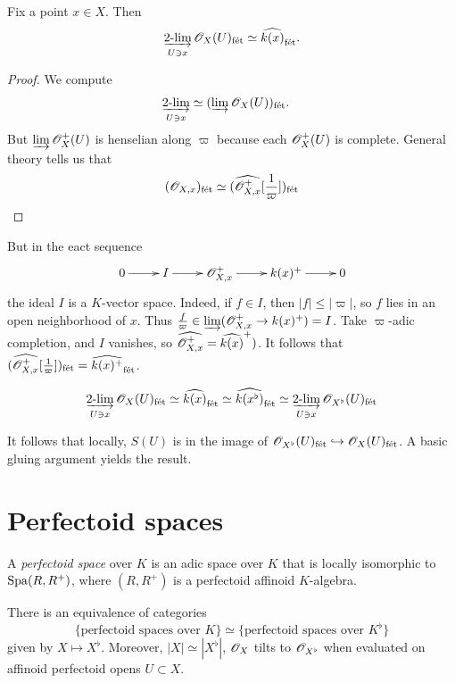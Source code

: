 \documentclass{article}
\begin{document}
\begin{lemma}
Fix a point $x\in X$. Then 
\[
  \twolim_{U\ni x} \sO_X(U)_\fet \simeq \widehat{k(x)}_\fet .
\]
\end{lemma}
\begin{proof}
We compute 
\begin{align*}
  \twolim_{U\ni x} &\simeq (\varinjlim \sO_X(U))_\fet .
\end{align*}
But $\varinjlim \mathscr{O}_X^+(U)$ is henselian along $\varpi$ because each 
$\mathscr{O}_X^+(U)$ is complete. General theory tells us that 
\[
  (\mathscr{O}_{X,x})_{\textnormal{f\'et}} \simeq (\widehat{\mathscr{O}_{X,x}^+}[\frac 1 \varpi])_{\textnormal{f\'et}}
\]
\end{proof}
But in the eact sequence 
\[\xymatrix{
  0 \ar[r] 
    & I \ar[r] 
    & \sO_{X,x}^+ \ar[r] 
    & k(x)^+ \ar[r] 
    & 0 
}\]
the ideal $I$ is a $K$-vector space. Indeed, if $f\in I$, then $|f|\leqslant |\varpi|$, 
so $f$ lies in an open neighborhood of $x$. Thus 
$\frac f \varpi \in \varinjlim(\mathscr{O}_{X,x}^+ \to k(x)^+) = I$. Take $\varpi$-adic 
completion, and $I$ vanishes, so $\widehat{\mathscr{O}_{X,x}^+} = \widehat{k(x)}^+)$. It 
follows that $(\widehat{\mathscr{O}_{X,x}^+}[\frac 1 \varpi])_{\textnormal{f\'et}} = \widehat{k(x)^+}_{\textnormal{f\'et}}$. 

\begin{corollary}
\[
  \twolim_{U\ni x} \sO_X(U)_\fet \simeq \widehat{k(x)}_\fet \simeq \widehat{k(x^\flat)}_\fet \simeq \twolim_{U\ni x} \sO_{X^\flat}(U)_\fet 
\]
\end{corollary}

It follows that locally, $S(U)$ is in the image of $\mathscr{O}_{X^\flat}(U)_{\textnormal{f\'et}}\hookrightarrow \mathscr{O}_X(U)_{\textnormal{f\'et}}$. A basic gluing argument yields the result. 






\section{Perfectoid spaces}

\begin{definition}
A \emph{perfectoid space} over $K$ is an adic space over $K$ that is locally isomorphic 
to $\operatorname{Spa}(R,R^+)$, where $(R,R^+)$ is a perfectoid affinoid $K$-algebra. 
\end{definition}

\begin{corollary}
There is an equivalence of categories 
\[
  \{\text{perfectoid spaces over }K\} \simeq \{\text{perfectoid spaces over $K^\flat$}\} 
\]
given by $X\mapsto X^\flat$. Moreover, $|X|\simeq |X^\flat|$, 
$\mathscr{O}_X$ tilts to $\mathscr{O}_{X^\flat}$ when evaluated on affinoid perfectoid opens 
$U\subset X$. 
\end{corollary}
\end{document}

